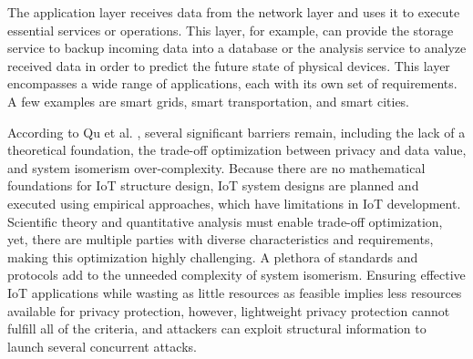\documentclass[conference]{IEEEtran}
\begin{document}
The application layer receives data from the network layer and uses it to
execute essential services or operations. This layer, for example, can provide
the storage service to backup incoming data into a database or the analysis
service to analyze received data in order to predict the future state of
physical devices. This layer encompasses a wide range of applications, each
with its own set of requirements. A few examples are smart grids, smart transportation,
and smart cities.


According to Qu et al. \cite{Qu2018Privacy}, several significant barriers
remain, including the lack of a theoretical foundation, the trade-off optimization
between privacy and data value, and system isomerism over-complexity. Because
there are no mathematical foundations for IoT structure design, IoT system
designs are planned and executed using empirical approaches, which have limitations
in IoT development. Scientific theory and quantitative analysis must enable
trade-off optimization, yet, there are multiple parties with diverse characteristics
and requirements, making this optimization highly challenging. A plethora
of standards and protocols add to the unneeded complexity of system isomerism.
Ensuring effective IoT applications while wasting as little resources as feasible
implies less resources available for privacy protection, however, lightweight
privacy protection cannot fulfill all of the criteria, and attackers can
exploit structural information to launch several concurrent attacks.
\end{document}
